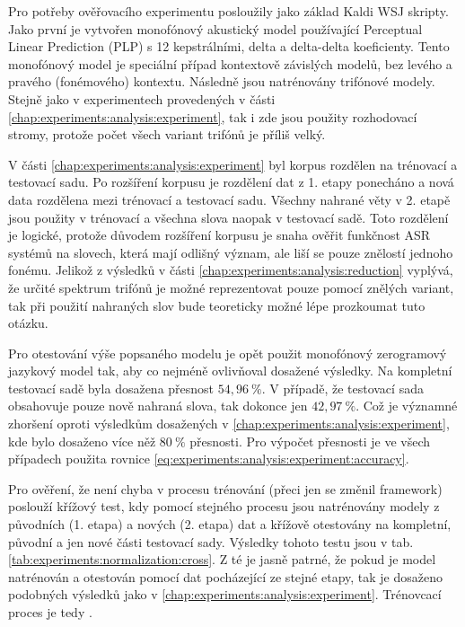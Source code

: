 Pro potřeby ověřovacího experimentu posloužily jako základ Kaldi WSJ skripty. Jako první je vytvořen monofónový akustický model používající Perceptual Linear Prediction (PLP) s 12 kepstrálními, delta a delta-delta koeficienty. Tento monofónový model je speciální případ kontextově závislých modelů, bez levého a pravého (fonémového) kontextu. Následně jsou natrénovány trifónové modely. Stejně jako v experimentech provedených v části \ref{chap:experiments:analysis:experiment}, tak i zde jsou použity rozhodovací stromy, protože počet všech variant trifónů je příliš velký.

V části \ref{chap:experiments:analysis:experiment} byl korpus rozdělen na trénovací a testovací sadu. Po rozšíření korpusu je rozdělení dat z 1. etapy ponecháno a nová data rozdělena mezi trénovací a testovací sadu. Všechny nahrané věty v 2. etapě jsou použity v trénovací a všechna slova naopak v testovací sadě. Toto rozdělení je logické, protože důvodem rozšíření korpusu je snaha ověřit funkčnost ASR systémů na slovech, která mají odlišný význam, ale liší se pouze znělostí jednoho fonému. Jelikož z výsledků v části \ref{chap:experiments:analysis:reduction} vyplývá, že určité spektrum trifónů je možné reprezentovat pouze pomocí znělých variant, tak při použití nahraných slov bude teoreticky možné lépe prozkoumat tuto otázku.

Pro otestování výše popsaného modelu je opět použit monofónový zerogramový jazykový model tak, aby co nejméně ovlivňoval dosažené výsledky. Na kompletní testovací sadě byla dosažena přesnost $54,96\ \%$. V případě, že testovací sada obsahovuje pouze nově nahraná slova, tak dokonce jen $42,97\ \%$. Což je významné zhoršení oproti výsledkům dosažených v \ref{chap:experiments:analysis:experiment}, kde bylo dosaženo více něž $80\ \%$ přesnosti. Pro výpočet přesnosti je ve všech případech použita rovnice \ref{eq:experiments:analysis:experiment:accuracy}.

Pro ověření, že není chyba v procesu trénování (přeci jen se změnil framework) poslouží křížový test, kdy pomocí stejného procesu jsou natrénovány modely z původních (1. etapa) a nových (2. etapa) dat a křížově otestovány na kompletní, původní a jen nové části testovací sady. Výsledky tohoto testu jsou v tab. \ref{tab:experiments:normalization:cross}. Z té je jasně patrné, že pokud je model natrénován a otestován pomocí dat pocházející ze stejné etapy, tak je dosaženo podobných výsledků jako v \ref{chap:experiments:analysis:experiment}. Trénovcací proces je tedy .

